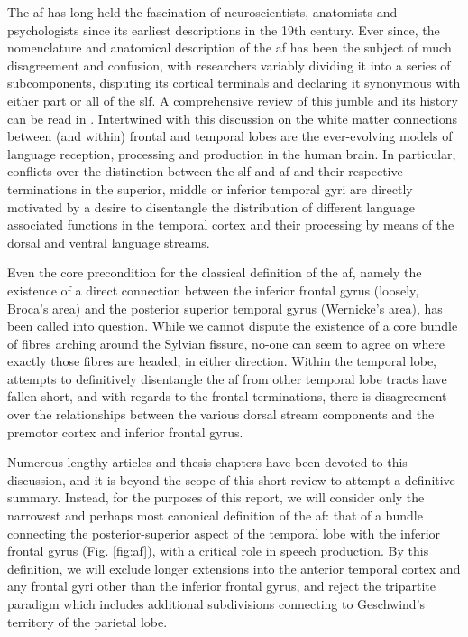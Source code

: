 The \gls{af} has long held the fascination of neuroscientists, anatomists and psychologists since its earliest descriptions in the 19th century.\autocite{Burdach1822}
Ever since, the nomenclature and anatomical description of the \gls{af} has been the subject of much disagreement and confusion, with researchers variably dividing it into a series of subcomponents, disputing its cortical terminals and declaring it synonymous with either part or all of the \gls{slf}.
A comprehensive review of this jumble and its history can be read in \textcite{PortodeOliveira2021}.
Intertwined with this discussion on the white matter connections between (and within) frontal and temporal lobes are the ever-evolving models of language reception, processing and production in the human brain.\autocite{Becker2022a}
In particular, conflicts over the distinction between the \gls{slf} and \gls{af} and their respective terminations in the superior, middle or inferior temporal gyri are directly motivated by a desire to disentangle the distribution of different language associated functions in the temporal cortex and their processing by means of the dorsal and ventral language streams.\autocite{Hickok2004,Friederici2013a,Kljajevic2014a,Giampiccolo2022a,Becker2022a}

Even the core precondition for the classical definition of the \gls{af}, namely the existence of a direct connection between the inferior frontal gyrus (loosely, Broca's area) and the posterior superior temporal gyrus (Wernicke's area), has been called into question.\autocite{Dick2012,Giampiccolo2022a}
While we cannot dispute the existence of a core bundle of fibres arching around the Sylvian fissure, no-one can seem to agree on where exactly those fibres are headed, in either direction.
Within the temporal lobe, attempts to definitively disentangle the \gls{af} from other temporal lobe tracts have fallen short,\autocite{Becker2022} and with regards to the frontal terminations, there is disagreement over the relationships between the various dorsal stream components and the premotor cortex and inferior frontal gyrus.\autocite{Kljajevic2014a,Giampiccolo2022a}

Numerous lengthy articles and thesis chapters have been devoted to this discussion, and it is beyond the scope of this short review to attempt a definitive summary.
Instead, for the purposes of this report, we will consider only the narrowest and perhaps most canonical definition of the \gls{af}: that of a bundle connecting the posterior-superior aspect of the temporal lobe with the inferior frontal gyrus (Fig. \ref{fig:af}), with a critical role in speech production.\autocite{Baldo2015}
By this definition, we will exclude longer extensions into the anterior temporal cortex\autocite{Giampiccolo2022a} and any frontal gyri other than the inferior frontal gyrus, and reject the tripartite paradigm which includes additional subdivisions connecting to Geschwind's territory of the parietal lobe.\autocite{Catani2005,Martino2013a}

